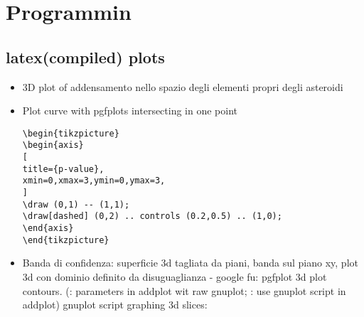 \chapter{Programmin}

\section{latex(compiled) plots}

\begin{itemize}

\item 3D plot of addensamento nello spazio degli elementi propri degli asteroidi

\item Plot curve with pgfplots intersecting in one point
\begin{verbatim}
\begin{tikzpicture}
\begin{axis}
[
title={p-value},
xmin=0,xmax=3,ymin=0,ymax=3,
]
\draw (0,1) -- (1,1);
\draw[dashed] (0,2) .. controls (0.2,0.5) .. (1,0);
\end{axis}
\end{tikzpicture}
\end{verbatim}

\item Banda di confidenza: superficie 3d tagliata da piani, banda sul piano xy, plot 3d con dominio definito da disuguaglianza - google fu: pgfplot 3d plot contours. (\cite{tikzgnuplotparam}: parameters in addplot wit raw gnuplot; \cite{tikzgnuplotscript}: use gnuplot script in addplot)
gnuplot script graphing 3d slices:


\end{itemize}
